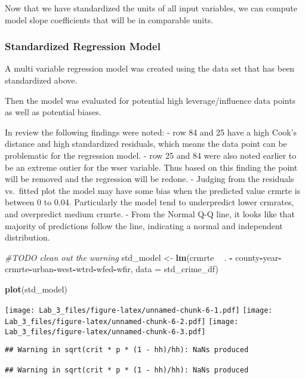 \documentclass[]{article}
\newenvironment{Shaded}{\begin{snugshade}}{\end{snugshade}}
\newcommand{\KeywordTok}[1]{\textcolor[rgb]{0.13,0.29,0.53}{\textbf{#1}}}
\newcommand{\DataTypeTok}[1]{\textcolor[rgb]{0.13,0.29,0.53}{#1}}
\newcommand{\StringTok}[1]{\textcolor[rgb]{0.31,0.60,0.02}{#1}}
\newcommand{\CommentTok}[1]{\textcolor[rgb]{0.56,0.35,0.01}{\textit{#1}}}
\newcommand{\OperatorTok}[1]{\textcolor[rgb]{0.81,0.36,0.00}{\textbf{#1}}}
\newcommand{\NormalTok}[1]{#1}
\begin{document}
Now that we have standardized the units of all input variables, we can
compute model slope coefficients that will be in comparable units.

\subsubsection{Standardized Regression
Model}\label{standardized-regression-model}

A multi variable regression model was created using the data set that
has been standardized above.

Then the model was evaluated for potential high leverage/influence data
points as well as potential biases.

In review the following findings were noted: - row 84 and 25 have a high
Cook's distance and high standardized residuals, which means the data
point can be problematic for the regression model. - row 25 and 84 were
also noted earlier to be an extreme outier for the wser variable. Thus
based on this finding the point will be removed and the regression will
be redone. - Judging from the residuals vs.~fitted plot the model may
have some bias when the predicted value crmrte is between 0 to 0.04.
Particularly the model tend to underpredict lower crmrates, and
overpredict medium crmrte. - From the Normal Q-Q line, it looks like
that majority of predictions follow the line, indicating a normal and
independent distribution.

\begin{Shaded}
\begin{Highlighting}[]
\CommentTok{#TODO clean out the warning}
\NormalTok{std_model <-}\StringTok{ }\KeywordTok{lm}\NormalTok{(crmrte }\OperatorTok{~}\StringTok{ }\NormalTok{. }\OperatorTok{-}\StringTok{ }\NormalTok{county}\OperatorTok{-}\NormalTok{year}\OperatorTok{-}\NormalTok{crmrte}\OperatorTok{-}\NormalTok{urban}\OperatorTok{-}\NormalTok{west}\OperatorTok{-}\NormalTok{wtrd}\OperatorTok{-}\NormalTok{wfed}\OperatorTok{-}\NormalTok{wfir, }\DataTypeTok{data =}\NormalTok{  std_crime_df)}

\KeywordTok{plot}\NormalTok{(std_model)}
\end{Highlighting}
\end{Shaded}

\texttt{[image: Lab\_3\_files/figure-latex/unnamed-chunk-6-1.pdf]}
\texttt{[image: Lab\_3\_files/figure-latex/unnamed-chunk-6-2.pdf]}
\texttt{[image: Lab\_3\_files/figure-latex/unnamed-chunk-6-3.pdf]}

\begin{verbatim}
## Warning in sqrt(crit * p * (1 - hh)/hh): NaNs produced

## Warning in sqrt(crit * p * (1 - hh)/hh): NaNs produced
\end{verbatim}
\end{document}
